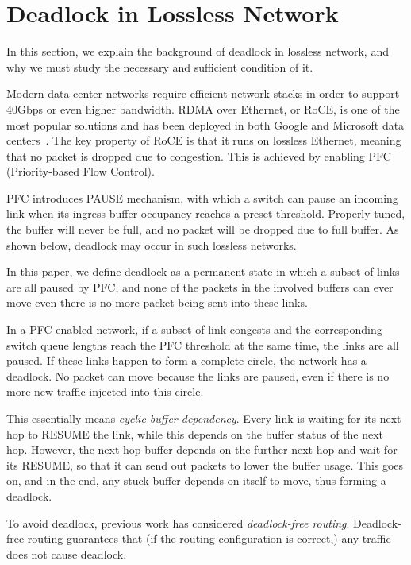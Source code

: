 \section{Deadlock in Lossless Network}

In this section, we explain the background of deadlock in lossless network, and 
why we must study the necessary and sufficient condition of it.

Modern data center networks require efficient network stacks in order to support 
40Gbps or even higher bandwidth. RDMA over Ethernet, or RoCE, is one of the most popular
solutions and has been deployed in both Google and Microsoft data centers~\cite{dcqcn, timely}.
The key property of RoCE is that it runs on lossless Ethernet, meaning
that no packet is dropped due to congestion. This is achieved by enabling PFC 
(Priority-based Flow Control).

PFC introduces PAUSE mechanism, with which a switch can pause an incoming link
when its ingress buffer occupancy reaches a preset threshold. Properly tuned, the 
buffer will never be full, and no packet will be dropped due to full buffer.
As shown below, deadlock may occur in such lossless networks.


In this paper, we define deadlock as a permanent state in which a subset of links are all paused
by PFC, and none of the packets in the involved buffers can ever move even there is 
no more packet being sent into these links.

In a PFC-enabled network, if a subset of link congests and the corresponding switch queue lengths reach
the PFC threshold at the same time, the links are all paused. If these links happen
to form a complete circle, the network has a deadlock. No packet can move because 
the links are paused, even if there is no more new traffic injected into this circle.

This essentially means {\em cyclic buffer dependency}. Every link is waiting for its next
hop to RESUME the link, while this depends on the buffer status of the next hop. However,
the next hop buffer depends on the further next hop and wait for its RESUME,
so that it can send out packets to lower the buffer usage. This goes on, and in the end, 
any stuck buffer depends on itself to move, thus forming a deadlock.

To avoid deadlock, previous work has considered {\em deadlock-free routing}. Deadlock-free
routing guarantees that (if the routing configuration is correct,) any traffic does not
cause deadlock.

